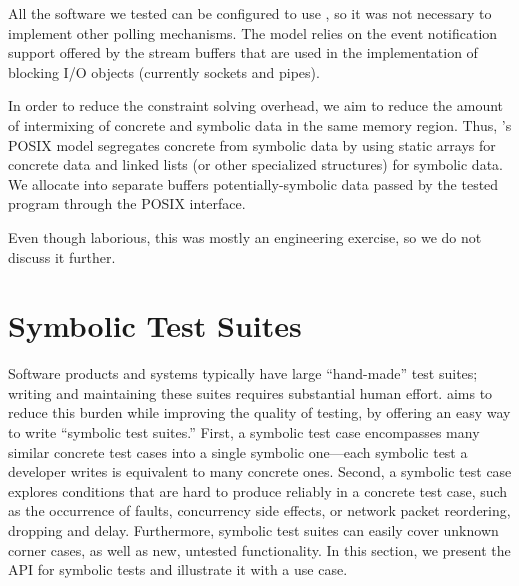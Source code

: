   All the software we tested can be configured to use , so it was not necessary to implement other polling mechanisms.  The  model relies on the event notification support offered by the stream buffers that are used in the implementation of blocking I/O objects (currently sockets and pipes).

  In order to reduce the constraint solving overhead, we aim to reduce the amount of intermixing of concrete and symbolic data in the same memory region.  Thus, \cnine's POSIX model segregates concrete from symbolic data by using static arrays for concrete data and linked lists (or other specialized structures) for symbolic data.  We allocate into separate buffers potentially-symbolic data passed by the tested program through the POSIX interface.

  Even though laborious, this was mostly an engineering exercise, so we do not discuss it further.



\section{Symbolic Test Suites}
\label{sec:cloud9:platform}

Software products and systems typically have large ``hand-made'' test suites; writing and maintaining these suites requires substantial human effort.  \cnine aims to reduce this burden while improving the quality of testing, by offering an easy way to write ``symbolic test suites.'' First, a symbolic test case encompasses many similar concrete test cases into a single symbolic one---each symbolic test a developer writes is equivalent to many concrete ones.  Second, a symbolic test case explores conditions that are hard to produce reliably in a concrete test case, such as the occurrence of faults, concurrency side effects, or network packet reordering, dropping and delay.  Furthermore, symbolic test suites can easily cover unknown corner cases, as well as new, untested functionality.  In this section, we present the API for symbolic tests and illustrate it with a use case.

